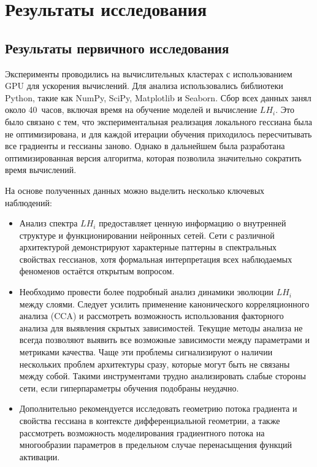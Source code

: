 \documentclass[a4paper,12pt]{article}
\begin{document}
\section{Результаты исследования}

\subsection{Результаты первичного исследования}

Эксперименты проводились на вычислительных кластерах с использованием GPU для ускорения
вычислений. Для анализа использовались библиотеки Python, такие как NumPy, SciPy, Matplotlib и Seaborn.
Сбор всех данных занял около 40~часов, включая время на обучение моделей и вычисление $LH_i$. Это
было связано с тем, что экспериментальная реализация локального гессиана была не оптимизирована, и для каждой
итерации обучения
приходилось пересчитывать все градиенты и гессианы заново. Однако в дальнейшем была разработана
оптимизированная версия алгоритма, которая позволила значительно сократить время вычислений.

На основе полученных данных можно выделить несколько ключевых наблюдений:
\begin{itemize}
  \item Анализ спектра $LH_i$ предоставляет ценную информацию о внутренней структуре и
    функционировании нейронных сетей. Сети с различной архитектурой демонстрируют характерные паттерны в спектральных
    свойствах гессианов, хотя формальная интерпретация всех наблюдаемых феноменов остаётся открытым вопросом.
  \item Необходимо провести более подробный анализ динамики эволюции $LH_i$ между слоями. Следует усилить
    применение канонического корреляционного анализа (CCA) и рассмотреть возможность использования факторного
    анализа для выявления скрытых зависимостей. Текущие методы анализа не всегда позволяют выявить все
    возможные зависимости между параметрами и метриками качества. Чаще эти проблемы сигнализируют о наличии
    нескольких проблем архитектуры сразу, которые могут быть не связаны между собой. Такими
    инструментами трудно анализировать слабые стороны сети, если гиперпараметры обучения подобраны неудачно.
  \item Дополнительно рекомендуется исследовать геометрию потока градиента и свойства гессиана в контексте
    дифференциальной геометрии, а также рассмотреть возможность моделирования градиентного потока на
    многообразии параметров в предельном случае перенасыщения функций активации.
\end{itemize}
\end{document}
